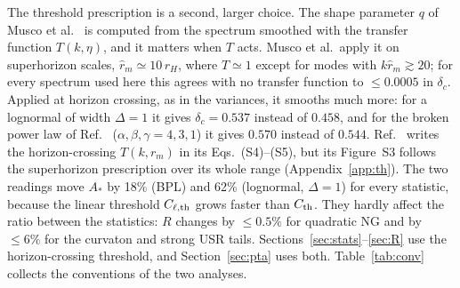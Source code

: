 \documentclass{article}
\begin{document}
The threshold prescription is a second, larger choice. The shape parameter $q$ of Musco et
al.~\cite{Musco21} is computed from the spectrum smoothed with the transfer function $T(k,\eta)$,
and it matters when $T$ acts. Musco et al.\ apply it on superhorizon scales, $\hat r_m\simeq10\,r_H$,
where $T\simeq1$ except for modes with $k\hat r_m\gtrsim20$; for every spectrum used here this
agrees with no transfer function to $\le0.0005$ in $\delta_c$. Applied at horizon crossing, as in
the variances, it smooths much more: for a lognormal of width $\Delta=1$ it gives $\delta_c=0.537$
instead of $0.458$, and for the broken power law of Ref.~\cite{FIVT23} ($\alpha,\beta,\gamma=4,3,1$)
it gives $0.570$ instead of $0.544$. Ref.~\cite{FIVT23} writes the horizon-crossing $T(k,r_m)$ in
its Eqs.~(S4)--(S5), but its Figure~S3 follows the superhorizon prescription over its whole range
(Appendix~\ref{app:th}). The two readings move $A_*$ by 18\% (BPL) and 62\% (lognormal, $\Delta=1$)
for every statistic, because the linear threshold $C_{\ell,\rm th}$ grows faster than $C_{\rm th}$.
They hardly affect the ratio between the statistics: $R$ changes by $\le0.5\%$ for quadratic NG
and by $\le6\%$ for the curvaton and strong USR tails. Sections~\ref{sec:stats}--\ref{sec:R} use
the horizon-crossing threshold, and Section~\ref{sec:pta} uses both. Table~\ref{tab:conv} collects
the conventions of the two analyses.
\end{document}
